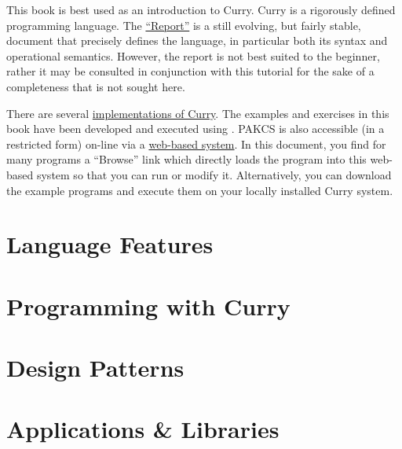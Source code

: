 This book is best used as an introduction to Curry.
Curry is a rigorously defined programming language.
The \href{\curryurl/documentation/report}
{``Report''} is a still evolving, but fairly stable,
document that precisely defines the language,
in particular both its syntax and operational semantics.
However, the report is not best suited to the beginner,
rather it may be consulted in conjunction with this
tutorial for the sake of a completeness that is not sought here.

There are several
\href{\curryurl/implementations/overview}{implementations of Curry}.
The examples and exercises in this book have been developed
and executed using \pakcs.
PAKCS is also accessible (in a restricted form) on-line via a
\href{https://smap.curry-lang.org/}{web-based system}.
In this document, you find for many programs a ``Browse'' link
which directly loads the program into this web-based system so that
you can run or modify it.
Alternatively, you can download the example programs
and execute them on your locally installed Curry system.



\part{Language Features}




\part{Programming with Curry}



\part{Design Patterns}


\part{Applications \& Libraries}





\newpage




\newpage
{}
\printindex



